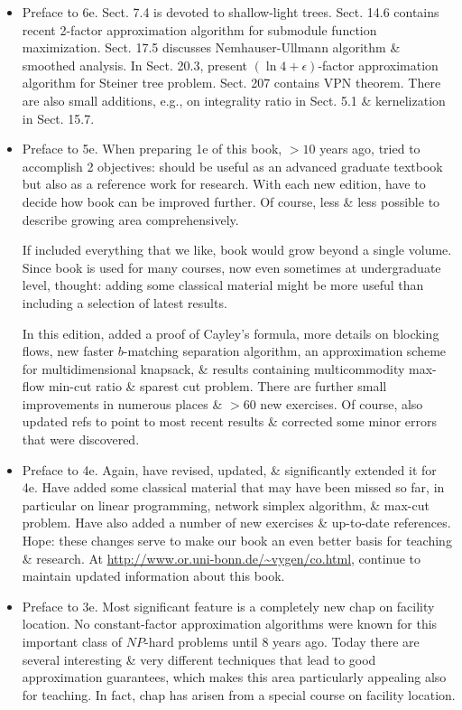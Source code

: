 \documentclass{article}
\begin{document}
\begin{itemize}
    \item {\sf Preface to 6e.} Sect. 7.4 is devoted to shallow-light trees. Sect. 14.6 contains recent 2-factor approximation algorithm for submodule function maximization. Sect. 17.5 discusses Nemhauser-Ullmann algorithm \& smoothed analysis. In Sect. 20.3, present $(\ln4 + \epsilon)$-factor approximation algorithm for Steiner tree problem. Sect. 207 contains VPN theorem. There are also small additions, e.g., on integrality ratio in Sect. 5.1 \& kernelization in Sect. 15.7.
    \item {\sf Preface to 5e.} When preparing 1e of this book, $> 10$ years ago, tried to accomplish 2 objectives: should be useful as an advanced graduate textbook but also as a reference work for research. With each new edition, have to decide how book can be improved further. Of course, less \& less possible to describe growing area comprehensively.

    If included everything that we like, book would grow beyond a single volume. Since book is used for many courses, now even sometimes at undergraduate level, thought: adding some classical material might be more useful than including a selection of latest results.

    In this edition, added a proof of Cayley's formula, more details on blocking flows, new faster $b$-matching separation algorithm, an approximation scheme for multidimensional knapsack, \& results containing multicommodity max-flow min-cut ratio \& sparest cut problem. There are further small improvements in numerous places \& $> 60$ new exercises. Of course, also updated refs to point to most recent results \& corrected some minor errors that were discovered.
    \item {\sf Preface to 4e.} Again, have revised, updated, \& significantly extended it for 4e. Have added some classical material that may have been missed so far, in particular on linear programming, network simplex algorithm, \& max-cut problem. Have also added a number of new exercises \& up-to-date references. Hope: these changes serve to make our book an even better basis for teaching \& research. At \url{http://www.or.uni-bonn.de/~vygen/co.html}, continue to maintain updated information about this book.
    \item {\sf Preface to 3e.} Most significant feature is a completely new chap on facility location. No constant-factor approximation algorithms were known for this important class of $NP$-hard problems until 8 years ago. Today there are several interesting \& very different techniques that lead to good approximation guarantees, which makes this area particularly appealing also for teaching. In fact, chap has arisen from a special course on facility location.


\end{itemize}
\end{document}
